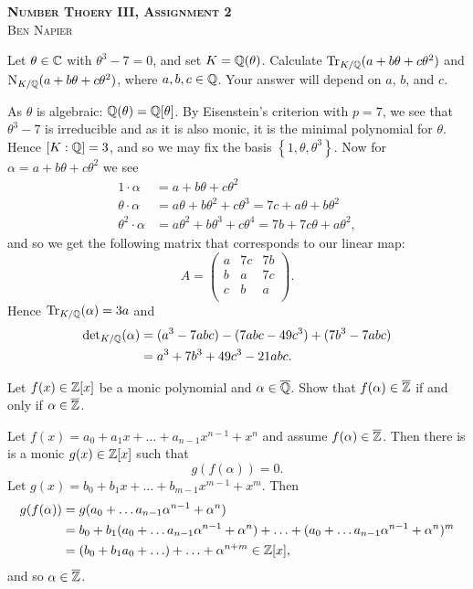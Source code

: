 \documentclass[a4paper, answers]{exam}
\begin{document}
\begin{center}
	\textbf{\textsc{Number Thoery III, Assignment 2}}
	\\
	\textsc{Ben Napier}
	\vspace{1em}
\end{center}
\begin{questions}
	\question 
	Let $\theta \in \mathbb{C}$ with $\theta^3 - 7 = 0$,
	and set $K = \mathbb{Q}(\theta)$.
	Calculate
	$\operatorname{Tr}_{K/\mathbb{Q}}(a + b\theta + c\theta^2)$
	and
	$\operatorname{N}_{K/\mathbb{Q}}(a + b\theta + c\theta^2)$,
	where $a,b,c \in \mathbb{Q}$.
	Your answer will depend on $a$, $b$, and $c$.
	\begin{solution}
		As $\theta$ is algebraic: $\mathbb{Q}(\theta) = \mathbb{Q}[\theta]$.
		By Eisenstein's criterion with $p = 7$,
		we see that $\theta^3 - 7$ is irreducible and
		as it is also monic, it is the minimal polynomial for $\theta$.
		Hence $[K : \mathbb{Q}] = 3$, and so we may fix the basis
		$ \left\{ 1, \theta, \theta^3 \right\}$.
		Now for $\alpha = a + b\theta + c\theta^2$
		we see
		\begin{align*}
			1 \cdot \alpha
				&= a + b\theta + c\theta^2 \\
			\theta \cdot \alpha
				&= a\theta + b\theta^2 + c\theta^3
				= 7c + a\theta + b \theta^2 \\
			\theta^2 \cdot \alpha
				&= a\theta^2 + b\theta^3 + c\theta^4
				= 7b + 7c\theta + a\theta^2,
		\end{align*}
		and so we get the following matrix that corresponds to our linear
		map:
		\[
			A =
			\begin{pmatrix}
				a & 7c & 7b \\
				b & a & 7c \\
				c & b & a \\ 
			\end{pmatrix}.
		\]
		Hence
		$
			\operatorname{Tr}_{K/\mathbb{Q}}(\alpha) = 3a
		$
		and
		\begin{align*}
			\operatorname{det}_{K/\mathbb{Q}}(\alpha)
				&= (a^3 - 7abc) - (7abc - 49c^3) + (7b^3 - 7abc) \\
				&= a^3 + 7b^3 + 49c^3 - 21abc.
		\end{align*}
		
	\end{solution}

	\question
	Let $f(x) \in \mathbb{Z}[x]$ be a monic polynomial and
	$\alpha \in \overline{\mathbb{Q}}$.
	Show that $f(\alpha) \in \overline{\mathbb{Z}}$
	if and only if $\alpha \in \overline{\mathbb{Z}}$.
	\begin{solution}
		Let $f(x) = a_0 + a_1x + \ldots + a_{n-1} x^{n-1} + x^n$
		and assume $f(\alpha) \in \overline{\mathbb{Z}}$.
		Then there is is a monic $g(x) \in \mathbb{Z}[x]$ such that
		\[
			g(f(\alpha)) = 0.
		\]
		Let $g(x) = b_0 + b_1x + \ldots + b_{m-1} x^{m-1} + x^m$.
		Then
		\begin{align*}
			g(f(\alpha))
			&= g(a_0 + \ldots a_{n-1}\alpha^{n-1} + \alpha^n) \\
			&= b_0 + b_1(a_0 + \ldots a_{n-1}\alpha^{n-1} + \alpha^n) + \ldots
				+ (a_0 + \ldots a_{n-1}\alpha^{n-1} + \alpha^n)^m \\
			&= (b_0 + b_1a_0 + \ldots) + \ldots + \alpha^{n+m} \in \mathbb{Z}[x],
		\end{align*}
		and so $\alpha \in \overline{\mathbb{Z}}$.
		

\end{solution}
\end{questions}
\end{document}
